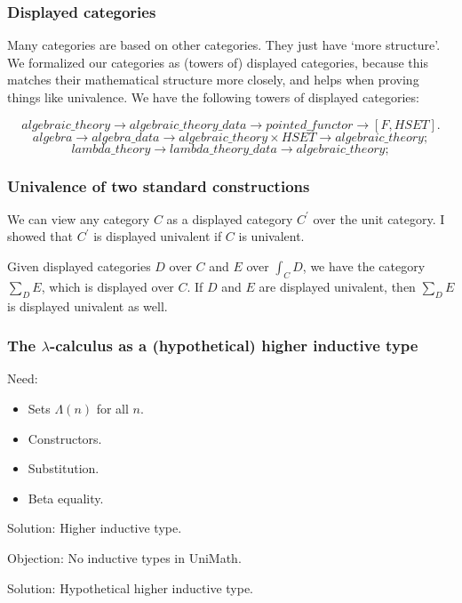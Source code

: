 \documentclass[aspectratio=169]{fancyslides} %
\begin{document}
  \begin{frame}
    \frametitle{Displayed categories}

    Many categories are based on other categories. They just have `more structure'. We formalized our categories as (towers of) displayed categories, because this matches their mathematical structure more closely, and helps when proving things like univalence. We have the following towers of displayed categories:

    \[ algebraic\_theory \to algebraic\_theory\_data \to pointed\_functor \to [F, HSET]. \]
    \[ algebra \to algebra\_data \to algebraic\_theory \times HSET \to algebraic\_theory;\]
    \[ lambda\_theory \to lambda\_theory\_data \to algebraic\_theory; \]
  \end{frame}

  \begin{frame}
    \frametitle{Univalence of two standard constructions}
    We can view any category $ C $ as a displayed category $ C^\prime $ over the unit category. I showed that $ C^\prime $ is displayed univalent if $ C $ is univalent.

    \pause

    Given displayed categories $ D $ over $ C $ and $ E $ over $ \int_C D $, we have the category $ \sum_D E $, which is displayed over $ C $. If $ D $ and $ E $ are displayed univalent, then $ \sum_D E $ is displayed univalent as well.
  \end{frame}

  \begin{frame}
    \frametitle{The $ \lambda $-calculus as a (hypothetical) higher inductive type}

    Need:
    \begin{itemize}
      \item Sets $ \Lambda(n) $ for all $ n $.
      \item Constructors.
      \item Substitution.
      \item Beta equality.
    \end{itemize}

    \pause

    Solution: Higher inductive type.

    \pause

    Objection: No inductive types in UniMath.

    \pause

    Solution: Hypothetical higher inductive type.
  \end{frame}
\end{document}
